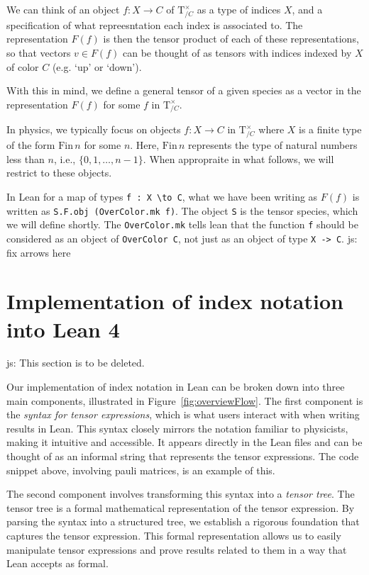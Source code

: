 \documentclass[a4paper, 11pt]{article}
\newcommand{\js}[1]{ {\color{magenta} js:  #1}}
\begin{document}
We can think of an object $f : X \to C$ of $\mathrm{T}_{/C}^\times$ as a type of indices $X$, and a specification 
of what repreesntation each index is associated to. The representation $F(f)$ is 
then the tensor product of each of these representations, so that vectors $v \in F(f)$ can be thought of as 
tensors with indices indexed by $X$ of color $C$ (e.g. `up' or `down'). 

With this in mind, we define a general tensor of a given species as a vector in the representation $F(f)$ 
for some $f$ in $\mathrm{T}_{/C}^\times$.

In physics, we typically focus on objects $f : X \to C$ in $\mathrm{T}_{/C}^\times$ where $X$ is a 
finite type of the form $\mathrm{Fin}\, n$ for some $n$. Here, $\mathrm{Fin}\, n$ represents the 
type of natural numbers less than $n$, i.e., $\{0, 1, \dots, n-1\}$. When appropraite in what follows, 
we will restrict to these objects.

In Lean for a map of types \lstinline|f : X \to C|, what we have been writing as $F(f)$ is written 
as \lstinline|S.F.obj (OverColor.mk f)|. The object \lstinline|S| is the tensor species, which we will
define shortly. The \lstinline|OverColor.mk| tells lean that the function \lstinline|f| should 
be considered as an object of \lstinline|OverColor C|, not just as an object of type \lstinline|X -> C|. \js{fix arrows here}

\section{Implementation of index notation into Lean 4}
\js{This section is to be deleted.}

Our implementation of index notation in Lean can be  broken down into 
three main components, illustrated in Figure~\ref{fig:overviewFlow}. 
The first component is the \emph{syntax for tensor expressions}, 
which is what users interact with when writing results in Lean. 
This syntax closely mirrors the notation familiar to physicists, 
making it intuitive and accessible. 
It appears directly in the Lean files and can be thought of as an informal string 
that represents the tensor expressions. The code snippet above, involving pauli matrices, is an 
example of this.

The second component involves transforming this syntax into a \emph{tensor tree}. 
The tensor tree is a formal mathematical representation of the tensor expression. 
By parsing the syntax into a structured tree, 
we establish a rigorous foundation that captures the tensor expression. 
This formal representation allows us to easily manipulate tensor expressions and
prove results related to them in a way that Lean accepts as formal.
\end{document}
